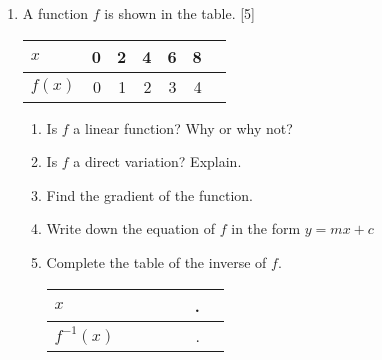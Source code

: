\documentclass[12pt, twoside]{article}
\begin{document}
\begin{enumerate}
  \newpage
  \item A function $f$ is shown in the table. \hfill [5]
  \begin{center}
    \begin{tabular}{|l|r|r|r|r|r|r|}
      \hline
      $x$ & 0 & 2 & 4 & 6 & 8\\ 
      \hline 
      $f(x)$ & 0 & 1 & 2 & 3 & 4\\ 
      \hline 
    \end{tabular}
  \end{center}
  \begin{enumerate}[itemsep=2.5cm]
    \item Is $f$ a linear function? Why or why not?
    \item Is $f$ a direct variation? Explain.
    \item Find the gradient of the function. \vspace{1cm}
    \item Write down the equation of $f$ in the form $y=mx+c$
    \item Complete the table of the inverse of $f$.
      \begin{center}
        \begin{tabular}{|l|r|r|r|r|r|r|}
          \hline
          $x$ & \hspace{1cm} & \hspace{1cm} & \hspace{1cm} & \hspace{1cm} & \hspace{1cm}.\\[1cm] 
          \hline 
          $f^{-1}(x)$ & \hspace{1cm} & \hspace{1cm} & \hspace{1cm} & \hspace{1cm} & \hspace{1cm}.\\[1cm] 
          \hline 
        \end{tabular}
      \end{center}
  \end{enumerate}

\newpage


\end{enumerate}
\end{document}
